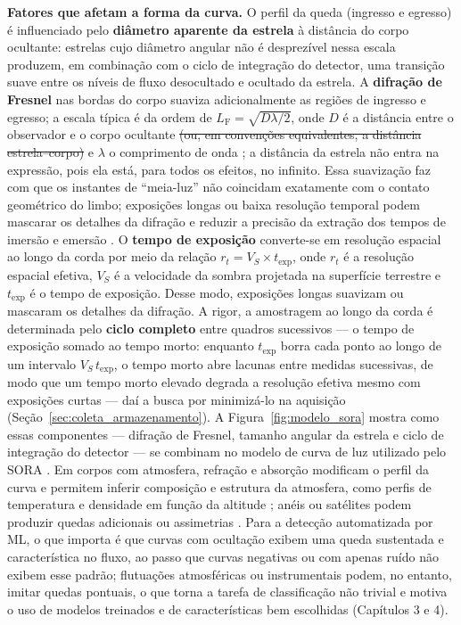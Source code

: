 \documentclass[msc]{on} %
\makeatletter
\providecommand{\DIFaddtex}[1]{{\protect\color{red}#1}} %
\providecommand{\DIFdeltex}[1]{{\protect\color{red}\sout{#1}}} %
\providecommand{\DIFaddbegin}{} %
\providecommand{\DIFaddend}{} %
\providecommand{\DIFdelbegin}{} %
\providecommand{\DIFdelend}{} %
\providecommand{\DIFadd}[1]{\texorpdfstring{\DIFaddtex{#1}}{#1}} %
\providecommand{\DIFdel}[1]{\texorpdfstring{\DIFdeltex{#1}}{}} %
\let\sout@orig\sout %
\renewcommand{\sout}[1]{\ifmmode\text{\sout@orig{\ensuremath{#1}}}\else\sout@orig{#1}\fi} %
\makeatother
\begin{document}
\textbf{Fatores que afetam a forma da curva.} O perfil da queda (ingresso e egresso) é influenciado pelo \textbf{diâmetro aparente da estrela} à distância do corpo ocultante: estrelas cujo diâmetro angular não é desprezível nessa escala produzem, em combinação com o ciclo de integração do detector, uma transição suave entre os níveis de fluxo desocultado e ocultado da estrela. A \textbf{difração de Fresnel} nas bordas do corpo suaviza adicionalmente as regiões de ingresso e egresso; a escala típica é da ordem de \(L_{\mathrm{F}} = \sqrt{D\lambda/2}\), onde \(D\) é a distância entre o observador e o corpo ocultante \DIFdelbegin \DIFdel{(ou, em convenções equivalentes, a distância estrela--corpo) }\DIFdelend e \(\lambda\) o comprimento de onda \citep{Roques1987}\DIFaddbegin \DIFadd{; a distância da estrela não entra na expressão, pois ela está, para todos os efeitos, no infinito}\DIFaddend . Essa suavização faz com que os instantes de ``meia-luz'' não coincidam exatamente com o contato geométrico do limbo; exposições longas ou baixa resolução temporal podem mascarar os detalhes da difração e reduzir a precisão da extração dos tempos de imersão e emersão \citep{SORA2022}. O \textbf{tempo de exposição} converte-se em resolução espacial ao longo da corda por meio da relação \(r_t = V_S \times t_{\mathrm{exp}}\), onde \(r_t\) é a resolução espacial efetiva, \(V_S\) é a velocidade da sombra projetada na superfície terrestre e \(t_{\mathrm{exp}}\) é o tempo de exposição. Desse modo, exposições longas suavizam ou mascaram os detalhes da difração. A rigor, a amostragem ao longo da corda é determinada pelo \textbf{ciclo completo} entre quadros sucessivos --- o tempo de exposição somado ao tempo morto: enquanto \(t_{\mathrm{exp}}\) borra cada ponto ao longo de um intervalo \(V_S\,t_{\mathrm{exp}}\), o tempo morto abre lacunas entre medidas sucessivas, de modo que um tempo morto elevado degrada a resolução efetiva mesmo com exposições curtas --- daí a busca por minimizá-lo na aquisição (Seção~\ref{sec:coleta_armazenamento}). A Figura~\ref{fig:modelo_sora} mostra como essas componentes --- difração de Fresnel, tamanho angular da estrela e ciclo de integração do detector --- se combinam no modelo de curva de luz utilizado pelo SORA \citep{SORA2022}. Em corpos com atmosfera, refração e absorção modificam o perfil da curva e permitem inferir composição e estrutura da atmosfera, como perfis de temperatura e densidade em função da altitude \citep{Sicardy2016}; anéis ou satélites podem produzir quedas adicionais ou assimetrias \citep{BragaRibas2014}. Para a detecção automatizada por ML, o que importa é que curvas com ocultação exibem uma queda sustentada e característica no fluxo, ao passo que curvas negativas ou com apenas ruído não exibem esse padrão; flutuações atmosféricas ou instrumentais podem, no entanto, imitar quedas pontuais, o que torna a tarefa de classificação não trivial e motiva o uso de modelos treinados e de características bem escolhidas (Capítulos 3 e 4).
\end{document}
